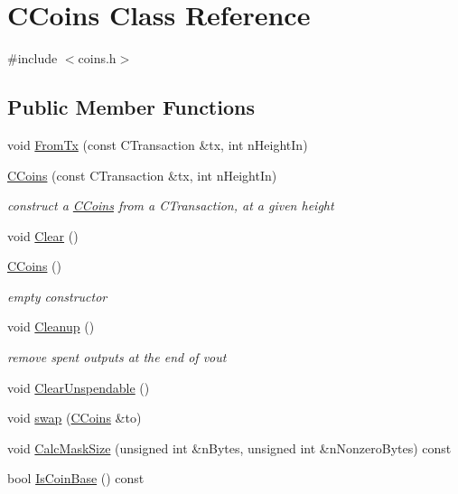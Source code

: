 \hypertarget{class_c_coins}{}\section{C\+Coins Class Reference}
\label{class_c_coins}


{\ttfamily \#include $<$coins.\+h$>$}

\subsection*{Public Member Functions}
\begin{DoxyCompactItemize}
\item 
void \hyperlink{class_c_coins_abf67e501a1d207c892c1f52dd383956e}{From\+Tx} (const C\+Transaction \&tx, int n\+Height\+In)
\item 
\hyperlink{class_c_coins_a303f3b245c339c11a1ea4318b01ec290}{C\+Coins} (const C\+Transaction \&tx, int n\+Height\+In)
\begin{DoxyCompactList}\small\item\em construct a \hyperlink{class_c_coins}{C\+Coins} from a C\+Transaction, at a given height \end{DoxyCompactList}\item 
void \hyperlink{class_c_coins_a4d4197688436b752234bea95f0230b82}{Clear} ()
\item 
\hyperlink{class_c_coins_a543757065d6c77d23953a33eecb31a46}{C\+Coins} ()
\begin{DoxyCompactList}\small\item\em empty constructor \end{DoxyCompactList}\item 
void \hyperlink{class_c_coins_a7cfa2efc07f4d35785c9c75caa8bddcb}{Cleanup} ()
\begin{DoxyCompactList}\small\item\em remove spent outputs at the end of vout \end{DoxyCompactList}\item 
void \hyperlink{class_c_coins_ad8b649abb32bdba255adec6dcfd57fc5}{Clear\+Unspendable} ()
\item 
void \hyperlink{class_c_coins_a9581324a74e9500b3d2cad472c0a830f}{swap} (\hyperlink{class_c_coins}{C\+Coins} \&to)
\item 
void \hyperlink{class_c_coins_a3dab547bdbce1152a2375c5c6c017ad5}{Calc\+Mask\+Size} (unsigned int \&n\+Bytes, unsigned int \&n\+Nonzero\+Bytes) const 
\item 
bool \hyperlink{class_c_coins_a5dda8b622fd4ebd48d382ea6be0db3c6}{Is\+Coin\+Base} () const 

\end{DoxyCompactItemize}
